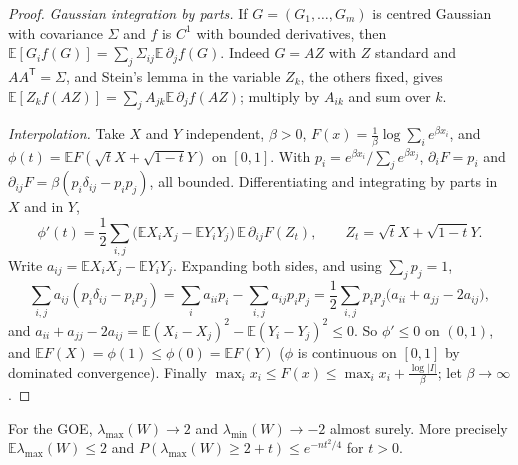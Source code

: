\begin{proof}
\emph{Gaussian integration by parts.} If $G=(G_1,\dots,G_m)$ is centred Gaussian with covariance $\Sigma$ and $f$ is $C^1$ with bounded derivatives, then $\mathbb E[G_if(G)]=\sum_j\Sigma_{ij}\mathbb E\,\partial_jf(G)$. Indeed $G=AZ$ with $Z$
standard and $AA^{\mathsf T}=\Sigma$, and Stein's lemma in the variable $Z_k$, the others fixed, gives $\mathbb E[Z_kf(AZ)]=\sum_jA_{jk}\mathbb E\,\partial_jf(AZ)$; multiply by $A_{ik}$ and sum over $k$.

\emph{Interpolation.} Take $X$ and $Y$ independent, $\beta>0$, $F(x)=\frac1\beta\log\sum_ie^{\beta x_i}$, and $\phi(t)=\mathbb EF(\sqrt tX+\sqrt{1-t}Y)$ on $[0,1]$. With $p_i=e^{\beta x_i}/\sum_je^{\beta x_j}$, $\partial_iF=p_i$ and
$\partial_{ij}F=\beta(p_i\delta_{ij}-p_ip_j)$, all bounded. Differentiating and integrating by parts in $X$ and in $Y$,
\[
\phi'(t)=\frac12\sum_{i,j}\bigl(\mathbb EX_iX_j-\mathbb EY_iY_j\bigr)\,\mathbb E\,\partial_{ij}F(Z_t),\qquad Z_t=\sqrt tX+\sqrt{1-t}Y.
\]
Write $a_{ij}=\mathbb EX_iX_j-\mathbb EY_iY_j$. Expanding both sides, and using $\sum_jp_j=1$,
\[
\sum_{i,j}a_{ij}(p_i\delta_{ij}-p_ip_j)=\sum_ia_{ii}p_i-\sum_{i,j}a_{ij}p_ip_j=\frac12\sum_{i,j}p_ip_j\bigl(a_{ii}+a_{jj}-2a_{ij}\bigr),
\]
and $a_{ii}+a_{jj}-2a_{ij}=\mathbb E(X_i-X_j)^2-\mathbb E(Y_i-Y_j)^2\le0$. So $\phi'\le0$ on $(0,1)$, and $\mathbb EF(X)=\phi(1)\le\phi(0)=\mathbb EF(Y)$ ($\phi$ is continuous on $[0,1]$ by dominated convergence). Finally
$\max_ix_i\le F(x)\le\max_ix_i+\frac{\log|I|}\beta$; let $\beta\to\infty$.
\end{proof}

\begin{theorem}\label{thm:lambdamax}
For the GOE, $\lambda_{\max}(W)\to2$ and $\lambda_{\min}(W)\to-2$ almost surely. More precisely $\mathbb E\lambda_{\max}(W)\le2$ and $P(\lambda_{\max}(W)\ge2+t)\le e^{-nt^2/4}$ for $t>0$.
\end{theorem}

